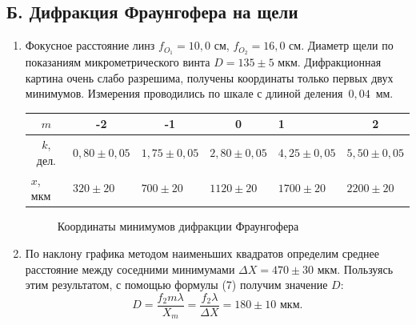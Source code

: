 \documentclass[a4paper,12pt]{article}
\begin{document}
\subsection*{Б. Дифракция Фраунгофера на щели}
\begin{enumerate}
	\item Фокусное расстояние линз $f_{O_1} = 10{,}0$ см, $f_{O_2} = 16{,}0$ см. Диаметр щели по показаниям микрометрического винта $D = 135\pm5$ мкм. Дифракционная картина очень слабо разрешима, получены координаты только первых двух минимумов. Измерения проводились по шкале с длиной деления~$0{,}04$~мм.
	\begin{center}
		\begin{tabular}{|c|c|c|c|l|c|}
			\hline
			$m$ & -2 & -1 & 0 & 1 & 2 \\ \hline
			$k$, дел. & $0{,}80\pm0{,}05$ & $1{,}75\pm0{,}05$ & $2{,}80\pm0{,}05$ & $4{,}25\pm0{,}05$ & $5{,}50\pm0{,}05$ \\ \hline
			\multicolumn{1}{|l|}{$x$, мкм} & \multicolumn{1}{l|}{$320\pm20$} & \multicolumn{1}{l|}{$700\pm20$} & \multicolumn{1}{l|}{$1120\pm20$} & $1700\pm20$ & \multicolumn{1}{l|}{$2200\pm20$} \\ \hline
		\end{tabular}
	\end{center}
	
\begin{figure}[!htb] \centering
	\caption{Координаты минимумов дифракции Фраунгофера}
\end{figure}

	\item По наклону графика методом наименьших квадратов определим среднее расстояние между соседними минимумами $\Delta X = 470\pm30$ мкм. Пользуясь этим результатом, с помощью формулы (7) получим значение $D$:
	\begin{equation*}
	D = \dfrac{f_2m\lambda}{X_m} = \dfrac{f_2 \lambda}{\Delta X} = 180\pm10\text{ мкм}.
	\end{equation*}
\end{enumerate}
\end{document}
